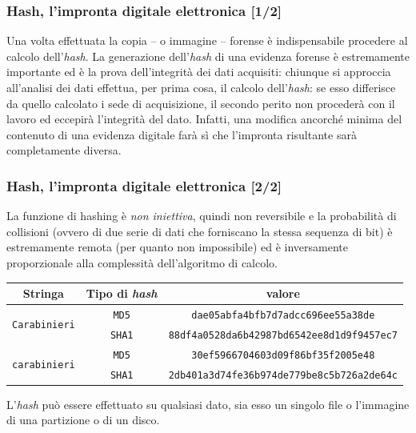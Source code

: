 \documentclass[11pt]{beamer}
\begin{document}
	\begin{frame}
		\frametitle{Hash, l'impronta digitale elettronica [1/2]}
		Una volta effettuata la copia -- o immagine -- forense è indispensabile procedere al calcolo dell'\textit{hash}.
		\vfill
		La generazione dell'\textit{hash} di una evidenza forense è estremamente importante ed è la prova dell'integrità dei dati acquisiti: chiunque si approccia all'analisi dei dati effettua, per prima cosa, il calcolo dell'\textit{hash}: se esso differisce da quello calcolato i sede di acquisizione, il secondo perito non procederà con il lavoro ed eccepirà l'integrità del dato. Infatti, una modifica ancorché minima del contenuto di una evidenza digitale farà sì che l'impronta risultante sarà completamente diversa.
	\end{frame}
	
	\begin{frame}
		\frametitle{Hash, l'impronta digitale elettronica [2/2]}
		
		La funzione di hashing è \textit{non iniettiva}, quindi non reversibile e la probabilità di collisioni (ovvero di due serie di dati che forniscano la stessa sequenza di bit) è estremamente remota (per quanto non impossibile) ed è inversamente proporzionale alla complessità dell'algoritmo di calcolo.
		
		
		\begin{table}
			\scriptsize
			\centering
			\begin{tabular}{c|c|c}
				
				Stringa & Tipo di \textit{hash} & valore \\
				\hline
				\multirow{2}{*}{\texttt{Carabinieri}} 
				& \texttt{MD5} & \texttt{dae05abfa4bfb7d7adcc696ee55a38de} \\
				\cline{2-3}
				& \texttt{SHA1} & \texttt{88df4a0528da6b42987bd6542ee8d1d9f9457ec7} \\
				
				\hline
				\multirow{2}{*}{\texttt{carabinieri}}
				& \texttt{MD5} & \texttt{30ef5966704603d09f86bf35f2005e48} \\
				\cline{2-3}
				& \texttt{SHA1} & \texttt{2db401a3d74fe36b974de779be8c5b726a2de64c} \\
			\end{tabular}
			
		\end{table}
		
		L'\textit{hash} può essere effettuato su qualsiasi dato, sia esso un singolo file o l'immagine di una partizione o di un disco.
	\end{frame}
	
\end{document}
